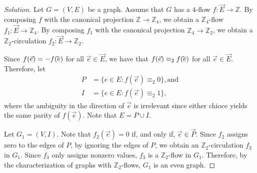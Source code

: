 \begin{proof}[Solution]
    Let \(G = (V, E)\) be a graph.
    Assume that \(G\) has a \(4\)-flow \(f \colon \vec{E} \to \mathbb{Z}\).
    By composing \(f\) with the canonical projection \(\mathbb{Z} \to \mathbb{Z}_4\),
    we obtain a \(\mathbb{Z}_4\)-flow \( f_1 \colon \vec{E} \to \mathbb{Z}_4\).
    By composing \(f_1\) with the canonical projection \(\mathbb{Z}_4 \to \mathbb{Z}_2\),
    we obtain a \(\mathbb{Z}_2\)-circulation \( f_2 \colon \vec{E} \to \mathbb{Z}_2\).

    Since \(f(\vec{e}) = -f(\cev{e})\) for all \(\vec{e} \in \vec{E}\),
    we have that \(f(\vec{e}) \equiv_2 f(\cev{e})\) for all \(\vec{e} \in \vec{E}\).
    Therefore,
    let
    \begin{align*}
        P & = \{ e \in E : f(\vec{e}) \equiv_2 0 \}, \text{and} \\
        I & = \{ e \in E : f(\vec{e}) \equiv_2 1 \},
    \end{align*}
    where the ambiguity in the direction of \(\vec{e}\) is irrelevant since either chioce yields the same parity of \(f(\vec{e})\).
    Note that \(E = P \cup I\).

    Let \(G_1 = (V, I)\).
    Note that \(f_2(\vec{e}) = 0\) if, and only if, \(\vec{e} \in \vec{P}\).
    Since \(f_2\) assigns zero to the edges of \(P\),
    by ignoring the edges of \(P\),
    we obtain an \(\mathbb{Z}_2\)-circulation \(f_3\) in \(G_1\).
    Since \(f_3\) only assigns nonzero values,
    \(f_3\) is a \(\mathbb{Z}_2\)-flow in \(G_1\).
    Therefore, by the characterization of graphs with \(\mathbb{Z}_2\)-flows,
    \(G_1\) is an even graph.


\end{proof}
